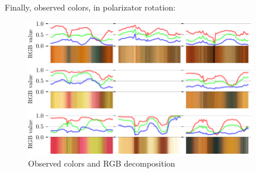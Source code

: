 Finally, observed colors, in polarizator rotation:

\begin{figure}[h]
    \centering
    \includegraphics[width=0.9\textwidth]{figures/P2.pdf}
    \caption{Observed colors and RGB decomposition}
\end{figure}
